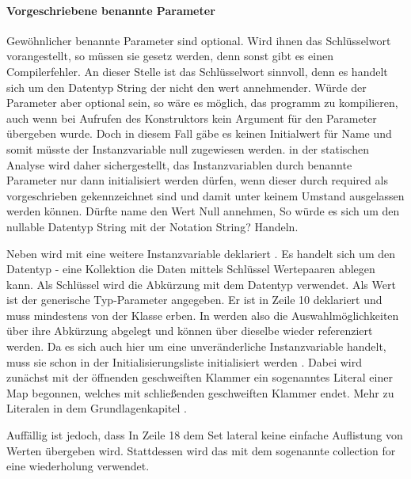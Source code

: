 \paragraph{Vorgeschriebene benannte Parameter}

Gewöhnlicher benannte Parameter sind optional.
Wird ihnen das Schlüsselwort  vorangestellt, so müssen sie gesetz werden, denn sonst gibt es einen Compilerfehler.
An dieser Stelle ist das  Schlüsselwort sinnvoll, denn es handelt sich um den Datentyp String der nicht den  wert  annehmender.
Würde  der Parameter aber optional sein, so wäre es möglich, das programm zu kompilieren, auch wenn bei Aufrufen des Konstruktors kein Argument für den Parameter übergeben wurde.
Doch in diesem Fall gäbe es keinen Initialwert für Name und somit müsste der  Instanzvariable null  zugewiesen werden.
in der statischen Analyse wird daher sichergestellt, das Instanzvariablen durch benannte Parameter nur dann initialisiert werden dürfen, wenn dieser durch required  als vorgeschrieben gekennzeichnet sind und damit unter keinem Umstand ausgelassen werden können.
Dürfte name den Wert Null annehmen, So würde es sich um den nullable Datentyp String  mit der Notation String? Handeln.

Neben  wird mit  eine weitere Instanzvariable deklariert .
Es handelt sich um den Datentyp  - eine Kollektion die Daten mittels Schlüssel Wertepaaren ablegen kann.
Als Schlüssel wird die Abkürzung mit dem Datentyp  verwendet.
Als Wert ist der generische Typ-Parameter  angegeben.
Er ist in Zeile 10 deklariert und muss mindestens von der Klasse  erben.
In  werden also die Auswahlmöglichkeiten über  ihre Abkürzung abgelegt und können über dieselbe wieder referenziert werden.
 Da es sich auch hier um eine unveränderliche Instanzvariable handelt, muss sie schon in der Initialisierungsliste initialisiert werden .
Dabei wird zunächst mit der öffnenden geschweiften Klammer  ein sogenanntes Literal einer Map  begonnen, welches mit schließenden geschweiften Klammer  endet.
Mehr zu  Literalen in dem Grundlagenkapitel .



Auffällig ist jedoch, dass In Zeile 18 dem Set lateral keine einfache Auflistung von Werten übergeben wird.
Stattdessen wird das mit dem sogenannte collection for eine wiederholung verwendet.



